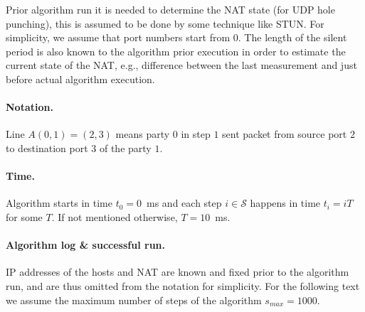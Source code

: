 \documentclass{llncs}
\begin{document}
Prior algorithm run it is needed to 
determine the NAT state (for UDP hole punching), this is assumed to be done by some technique like STUN. For simplicity, we assume that port numbers
start from $0$. The length of the silent period is also known to the algorithm prior execution in order to estimate the current state of 
the NAT, e.g., difference between the last measurement and just before actual algorithm execution.

\paragraph{Notation.}
Line $A(0,1) = (2,3)$ means party $0$ in step $1$ sent packet from source port $2$ to destination port $3$
of the party $1$.

\paragraph{Time.} 
Algorithm starts in time $t_0 = 0$~ms and each step $i \in \mathcal{S}$
happens in time $t_i = iT$ for some $T$. If not mentioned otherwise, $T = 10$~ms.


\paragraph{Algorithm log \& successful run.} IP addresses of the hosts and NAT are known and fixed prior to the algorithm run, and are thus omitted from the notation for simplicity. For the following text we assume the maximum number of steps of the algorithm $s_{max}=1000$.
\end{document}
